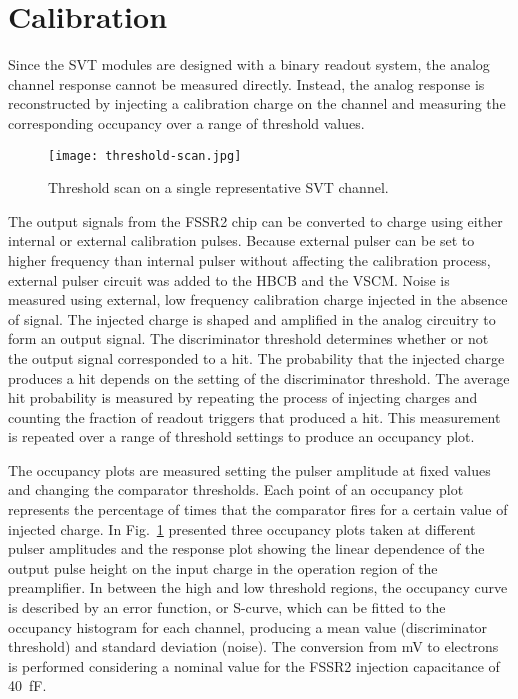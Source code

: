 \section{Calibration}

Since the SVT modules are designed with a binary readout system, the analog channel response cannot be measured directly. Instead, the analog response is reconstructed by injecting a calibration charge on the channel and measuring the corresponding occupancy over a range of threshold values. 

\begin{figure}[hbt] 
	\centering 
	\texttt{[image: threshold-scan.jpg]}
	\caption{Threshold scan on a single representative SVT channel.}
	\label{fig:threshold-scan}
\end{figure}

The output signals from the FSSR2 chip can be converted to charge using either internal or external calibration pulses. Because external pulser can be set to higher frequency than internal pulser without affecting the calibration process, external pulser circuit was added to the HBCB and the VSCM. Noise is measured using external, low frequency calibration charge injected in the absence of signal. The injected charge is shaped and amplified in the analog circuitry to form an output signal. The discriminator threshold determines whether or not the output signal corresponded to a hit. The probability that the injected charge produces a hit depends on the setting of the discriminator threshold. The average hit probability is measured by repeating the process of injecting charges and counting the fraction of readout triggers that produced a hit. This measurement is repeated over a range of threshold settings to produce an occupancy plot. 

The occupancy plots are measured setting the pulser amplitude at fixed values and changing the comparator thresholds. Each point of an occupancy plot represents the percentage of times that the comparator fires for a certain value of injected charge. In Fig.~\ref{fig:threshold-scan} presented three occupancy plots taken at different pulser amplitudes and the response plot showing the linear dependence of the output pulse height on the input charge in the operation region of the preamplifier. In between the high and low threshold regions, the occupancy curve is described by an error function, or S-curve, which can be fitted to the occupancy histogram for each channel, producing a mean value (discriminator threshold) and standard deviation (noise). The conversion from mV to electrons is performed considering a nominal value for the FSSR2 injection capacitance of 40~fF. 

